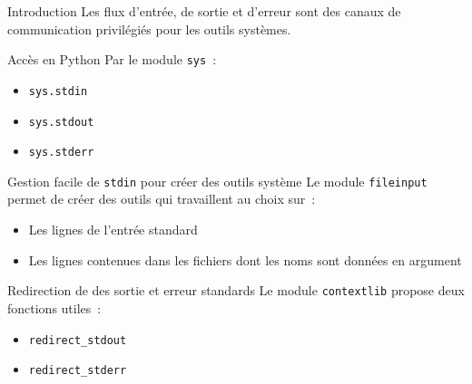 \begin{frame}{Introduction}
  Les flux d'entrée, de sortie et d'erreur sont des canaux de communication privilégiés pour les outils systèmes.
\end{frame}

\begin{frame}{Accès en Python}
  Par le module \texttt{sys}~:

  \begin{itemize}[<+(1)->]
    \item \texttt{sys.stdin}
    \item \texttt{sys.stdout}
    \item \texttt{sys.stderr}
  \end{itemize}

\end{frame}

\begin{frame}{Gestion facile de \texttt{stdin} pour créer des outils système}
  Le module \texttt{fileinput} permet de créer des outils qui travaillent au choix sur~:

  \begin{itemize}[<+(1)->]
    \item Les lignes de l'entrée standard
    \item Les lignes contenues dans les fichiers dont les noms sont données en argument
  \end{itemize}

\end{frame}

\begin{frame}{Redirection de des sortie et erreur standards}
  Le module \texttt{contextlib} propose deux fonctions utiles~:

  \begin{itemize}[<+(1)->]
    \item \texttt{redirect\_stdout}
    \item \texttt{redirect\_stderr}
  \end{itemize}
\end{frame}
